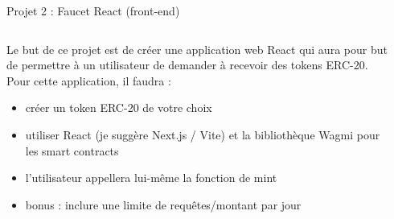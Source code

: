 \begin{frame}{Projet 2 : Faucet React (front-end)}

  \begin{columns}
    \begin{column}{0.57\textwidth}
      Le but de ce projet est de créer une application web React qui aura pour but de permettre à un utilisateur de demander à recevoir des tokens ERC-20.
      Pour cette application, il faudra :

      \begin{itemize}
        \item créer un token ERC-20 de votre choix
        \item utiliser React (je suggère Next.js / Vite) et la bibliothèque Wagmi pour les smart contracts
        \item l'utilisateur appellera lui-même la fonction de mint
        \item bonus : inclure une limite de requêtes/montant par jour
      \end{itemize}
    \end{column}
    \begin{column}{0.37\textwidth}
    \end{column}
    \hspace{0.03\textwidth}
  \end{columns}
\end{frame}